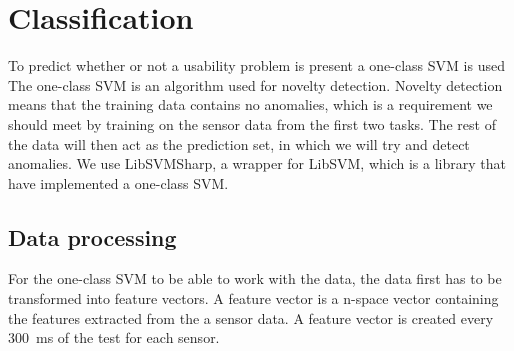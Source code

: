 \section{Classification}
To predict whether or not a usability problem is present a one-class SVM is used
The one-class SVM is an algorithm used for novelty detection. Novelty detection means that the training data contains no anomalies, which is a requirement we should meet by training on the sensor data from the first two tasks.
The rest of the data will then act as the prediction set, in which we will try and detect anomalies.
We use LibSVMSharp\cite{libsvmsharp}, a wrapper for LibSVM\cite{libsvm}, which is a library that have implemented a one-class SVM.

\subsection{Data processing}
For the one-class SVM to be able to work with the data, the data first has to be transformed into feature vectors.
A feature vector is a n-space vector containing the features extracted from the a sensor data.
A feature vector is created every 300~ms of the test for each sensor.


